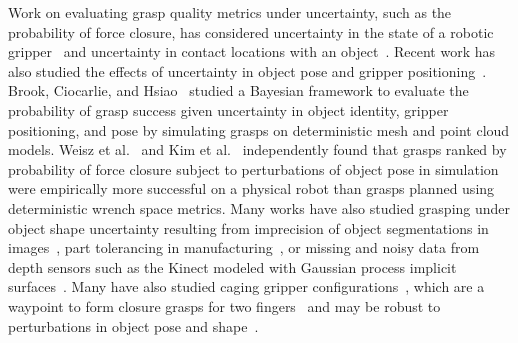 Work on evaluating grasp quality metrics under uncertainty, such as the probability of force closure, has considered uncertainty in the state of a robotic gripper~\cite{goldberg1990bayesian, stulp2011learning} and uncertainty in contact locations with an object~\cite{zheng2005}.
Recent work has also studied the effects of uncertainty in object pose and gripper positioning~\cite{brook2011collaborative, hsiao2011bayesian}.
Brook, Ciocarlie, and Hsiao~\cite{brook2011collaborative, hsiao2011bayesian} studied a Bayesian framework to evaluate the probability of grasp success given uncertainty in object identity, gripper positioning, and pose by simulating grasps on deterministic mesh and point cloud models.
Weisz et al.~\cite{weisz2012pose} and Kim et al.~\cite{kim2012physically} independently found that grasps ranked by probability of force closure subject to perturbations of object pose in simulation were empirically more successful on a physical robot than grasps planned using deterministic wrench space metrics. 
Many works have also studied grasping under object shape uncertainty resulting from imprecision of object segmentations in images~\cite{christopoulos2007handling}, part tolerancing in manufacturing~\cite{kehoe2012estimating, kehoe2012toward}, or missing and noisy data from depth sensors such as the Kinect modeled with Gaussian process implicit surfaces~\cite{mahler2015gp, laskey2015bandits}.
Many have also studied caging gripper configurations~\cite{rimon1996caging}, which are a waypoint to form closure grasps for two fingers~\cite{vahedi2008caging, rodriguez2012caging} and may be robust to perturbations in object pose and shape~\cite{diankov2008manipulation, Wan2012_ICRA}.

